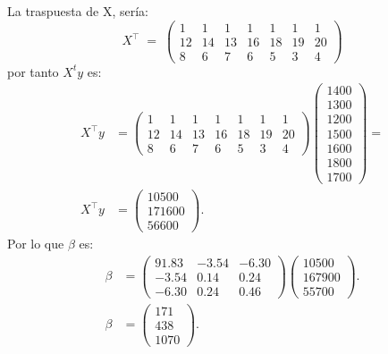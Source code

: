 \documentclass[10pt,a4paper]{article}
\begin{document}
\begin{enumerate}
\begin{enumerate}
La traspuesta de X, sería:
\[
X^{\top} \;=\;
\begin{pmatrix}
1 & 1 & 1 & 1 & 1 & 1 & 1\\
12 & 14 & 13 & 16 & 18 & 19 & 20 \\
8 & 6 & 7 & 6 & 5 & 3 & 4 
\end{pmatrix}
\]
por tanto $X^ty$ es:
\[
\begin{aligned}
X^{\top}y 
   &= 
\begin{pmatrix}
1 & 1 & 1 & 1 & 1 & 1 & 1\\
12 & 14 & 13 & 16 & 18 & 19 & 20 \\
8 & 6 & 7 & 6 & 5 & 3 & 4 
\end{pmatrix}
   \begin{pmatrix}
1400\\ 1300\\ 1200\\ 1500\\ 1600\\ 1800\\ 1700
\end{pmatrix} =                                              \\
X^{\top}y    &=
   \begin{pmatrix}
      10500 \\ 171600 \\ 56600
   \end{pmatrix}.
\end{aligned}
\]
Por lo que $\beta$ es:
\[
\begin{aligned}
\beta 
   &= 
\begin{pmatrix}
91.83 & -3.54 & -6.30 \\
-3.54 & 0.14 & 0.24 \\
-6.30 & 0.24 & 0.46
\end{pmatrix}
   \begin{pmatrix}
      10500 \\ 167900 \\ 55700
   \end{pmatrix}.                                             \\
\beta &=
   \begin{pmatrix}
      171 \\ 438 \\ 1070
   \end{pmatrix}.

\end{aligned}\]
\end{enumerate}
\end{enumerate}
\end{document}
